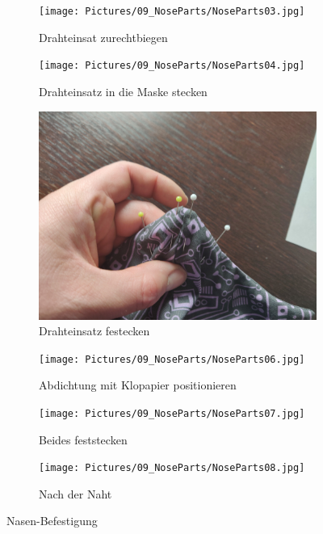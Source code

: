 \documentclass[12pt,parskip=full]{scrartcl}
\begin{document}
\begin{figure}[hp]
    \vspace{0.5cm}
    \centering
    \begin{subfigure}{0.48\textwidth}
        \centering
        \texttt{[image: Pictures/09\_NoseParts/NoseParts03.jpg]}
        \caption{Drahteinsat zurechtbiegen}
        \label{Nose03}
    \end{subfigure}
    \begin{subfigure}{0.48\textwidth}
        \centering
        \texttt{[image: Pictures/09\_NoseParts/NoseParts04.jpg]}
        \caption{Drahteinsatz in die Maske stecken}
        \label{Nose04}
    \end{subfigure}
    \begin{subfigure}{0.48\textwidth}
        \centering
        \includegraphics[width = \linewidth]{Pictures/09_NoseParts/NoseParts05.jpg}
        \caption{Drahteinsatz festecken}
        \label{Nose05}
    \end{subfigure}
    \begin{subfigure}{0.48\textwidth}
        \centering
        \texttt{[image: Pictures/09\_NoseParts/NoseParts06.jpg]}
        \caption{Abdichtung mit Klopapier positionieren}
        \label{Nose06}
    \end{subfigure}
    \begin{subfigure}{0.48\textwidth}
        \centering
        \texttt{[image: Pictures/09\_NoseParts/NoseParts07.jpg]}
        \caption{Beides feststecken}
        \label{Nose07}
    \end{subfigure}
    \begin{subfigure}{0.48\textwidth}
        \centering
        \texttt{[image: Pictures/09\_NoseParts/NoseParts08.jpg]}
        \caption{Nach der Naht}
        \label{Nose08}
    \end{subfigure}
    \caption{Nasen-Befestigung}
    \label{NoseMain}
\end{figure}
\end{document}
